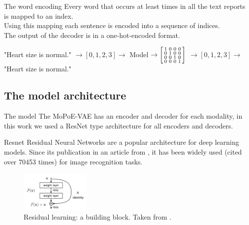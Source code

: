     \begin{frame}{The word encoding}
        Every word that occurs at least  times in all the text reports is mapped to an index.\\
        Using this mapping each sentence is encoded into a sequence of indices.\\
        The output of the decoder is in a one-hot-encoded format.
        
        \pause
        \vspace{\baselineskip}

        \small{
        "Heart size is normal." $\rightarrow [0,1,2,3] \rightarrow$ Model $\rightarrow
        \begin{bsmallmatrix}
            1 & 0 & 0 & 0\\
            0 & 1 & 0 & 0\\
            0 & 0 & 1 & 0\\
            0 & 0 & 0 & 1\\
        \end{bsmallmatrix}$
        $\rightarrow [0,1,2,3] \rightarrow$ "Heart size is normal."}
    \end{frame}

    \subsection{The model architecture}
    \begin{frame}{The model}
        The MoPoE-VAE has an encoder and decoder for each modality, in this work we used a ResNet type architecture for all encoders and decoders.
    \end{frame}

    \begin{frame}{Resnet}
        Residual Neural Networks are a popular architecture for deep learning models.
        Since its publication in an article from \cite{he2016deep}, it has been widely used (cited over 70453 times) for image recognition tasks.
        \begin{figure}
            \includegraphics[width=0.3\textwidth, keepaspectratio]{slides/Residual_block}
            \caption{Residual learning: a building block. Taken from \cite{he2016deep}.}
        \end{figure}

    \end{frame}

